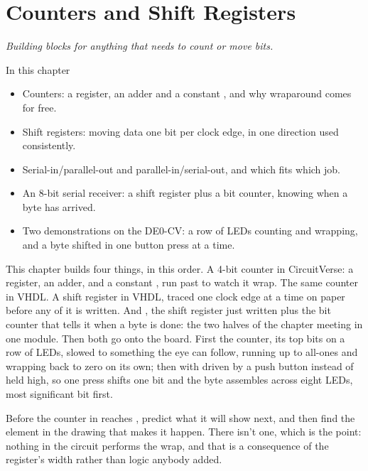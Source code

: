 
\chapter{Counters and Shift Registers}
\label{c6:ch}

{\large\itshape Building blocks for anything that needs to count or move bits.\par}

\begin{chapterbox}{In this chapter}
\begin{itemize}
  \item Counters: a register, an adder and a constant , and why wraparound comes for free.
  \item Shift registers: moving data one bit per clock edge, in one direction used consistently.
  \item Serial-in/parallel-out and parallel-in/serial-out, and which fits which job.
  \item An 8-bit serial receiver: a shift register plus a bit counter, knowing when a byte has
    arrived.
  \item Two demonstrations on the DE0-CV: a row of LEDs counting and wrapping, and a byte shifted in
    one button press at a time.
\end{itemize}
\end{chapterbox}

This chapter builds four things, in this order. A 4-bit counter in CircuitVerse: a register, an
adder, and a constant , run past  to watch it wrap. The same counter in VHDL. A
shift register in VHDL, traced one clock edge at a time on paper before any of it is written. And
, the shift register just written plus the bit counter that tells it when a byte
is done: the two halves of the chapter meeting in one module. Then both go onto the board. First
the counter, its top bits on a row of LEDs, slowed to something the eye can follow, running up to
all-ones and wrapping back to zero on its own; then  with 
driven by a push button instead of held high, so one press shifts one bit and the byte assembles
across eight LEDs, most significant bit first.

Before the counter in  reaches , predict what it will show next, and then
find the element in the drawing that makes it happen. There isn't one, which is the point: nothing
in the circuit performs the wrap, and that is a consequence of the register's width rather than
logic anybody added.

